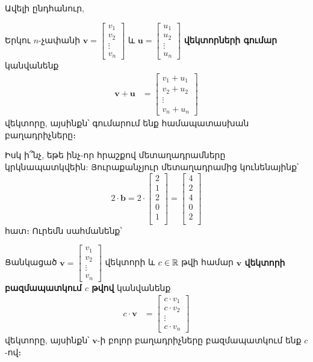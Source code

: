 Ավելի ընդհանուր, 
\newpage 
\begin{definition}
Երկու $n$-չափանի  \( \mathbf{v} = \begin{bmatrix} v_1 \\ v_2 \\ \vdots \\ v_n \end{bmatrix} \) և \( \mathbf{u} = \begin{bmatrix} u_1 \\ u_2 \\ \vdots \\ u_n \end{bmatrix} \) 
\textbf{վեկտոր\-ների գումար} կանվանենք
  \begin{align*}
    \mathbf{v} + \mathbf{u} &= \begin{bmatrix} v_1 + u_1 \\ v_2 + u_2 \\ \vdots \\ v_n + u_n \end{bmatrix}
  \end{align*}
վեկտորը, այսինքն՝ գումարում ենք համապատասխան բաղա\-դրիչ\-ները։
\end{definition}


Իսկ ի՞նչ, եթե ինչ-որ հրաշքով մետաղադրամները կրկնապատկվեին: Յուրաքանչյուր մետաղադրամից կունենայինք՝
$$2 \cdot \mathbf{b} = 2\cdot \begin{bmatrix}
2 \\1 \\2 \\0 \\1 \\
\end{bmatrix} = \begin{bmatrix}
4 \\2 \\4 \\0 \\2 \\
\end{bmatrix} $$
հատ։ Ուրեմն սահմանենք՝ 
\begin{definition}
Ցանկացած \( \mathbf{v} = \begin{bmatrix} v_1 \\ v_2 \\ \vdots \\ v_n \end{bmatrix} \) վեկտորի և  $c\in\mathbb{R}$ թվի համար \textbf{$\mathbf{v}$ վեկտորի բազմապատկում $c$ թվով} կանվանենք
  \begin{align*}
    c \cdot \mathbf{v} &= \begin{bmatrix} c \cdot v_1 \\ c \cdot v_2 \\ \vdots \\ c \cdot v_n \end{bmatrix}
  \end{align*}
վեկտորը, այսինքն՝ $\mathbf{v}$-ի բոլոր բաղադրիչները բազմապատկում ենք $c$-ով։
\end{definition}

